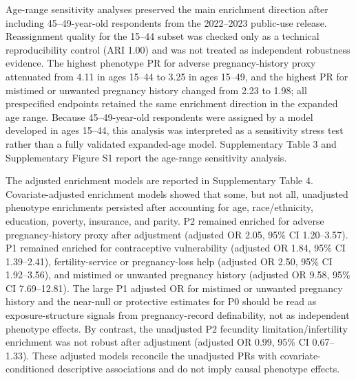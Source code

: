 \documentclass[referee,pdflatex,sn-basic,Numbered]{sn-jnl}
\begin{document}
Age-range sensitivity analyses preserved the main enrichment direction after including 45--49-year-old respondents from the 2022--2023 public-use release. Reassignment quality for the 15--44 subset was checked only as a technical reproducibility control (ARI 1.00) and was not treated as independent robustness evidence. The highest phenotype PR for adverse pregnancy-history proxy attenuated from 4.11 in ages 15--44 to 3.25 in ages 15--49, and the highest PR for mistimed or unwanted pregnancy history changed from 2.23 to 1.98; all prespecified endpoints retained the same enrichment direction in the expanded age range. Because 45--49-year-old respondents were assigned by a model developed in ages 15--44, this analysis was interpreted as a sensitivity stress test rather than a fully validated expanded-age model. Supplementary Table 3 and Supplementary Figure S1 report the age-range sensitivity analysis.

The adjusted enrichment models are reported in Supplementary Table 4. Covariate-adjusted enrichment models showed that some, but not all, unadjusted phenotype enrichments persisted after accounting for age, race/ethnicity, education, poverty, insurance, and parity. P2 remained enriched for adverse pregnancy-history proxy after adjustment (adjusted OR 2.05, 95\% CI 1.20--3.57). P1 remained enriched for contraceptive vulnerability (adjusted OR 1.84, 95\% CI 1.39--2.41), fertility-service or pregnancy-loss help (adjusted OR 2.50, 95\% CI 1.92--3.56), and mistimed or unwanted pregnancy history (adjusted OR 9.58, 95\% CI 7.69--12.81). The large P1 adjusted OR for mistimed or unwanted pregnancy history and the near-null or protective estimates for P0 should be read as exposure-structure signals from pregnancy-record definability, not as independent phenotype effects. By contrast, the unadjusted P2 fecundity limitation/infertility enrichment was not robust after adjustment (adjusted OR 0.99, 95\% CI 0.67--1.33). These adjusted models reconcile the unadjusted PRs with covariate-conditioned descriptive associations and do not imply causal phenotype effects.
\end{document}
